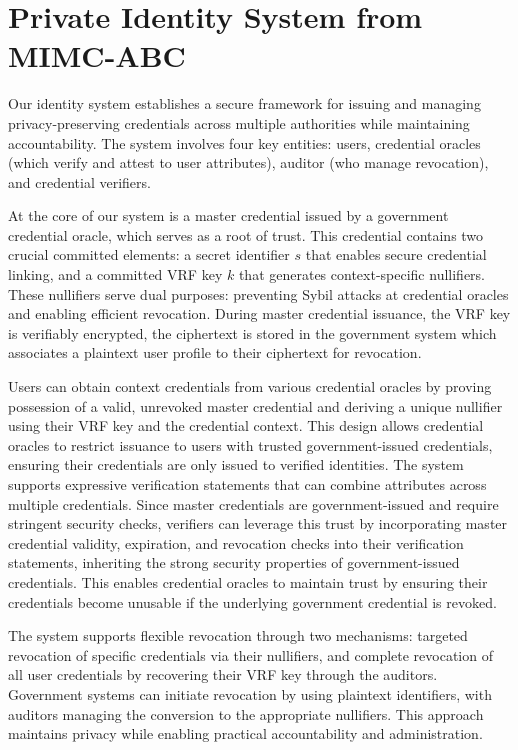 \cleardoublepage
\section{Private Identity System from MIMC-ABC}\label{sec:idsys}

Our identity system establishes a secure framework for issuing and managing privacy-preserving credentials across multiple authorities while maintaining accountability. The system involves four key entities: users, credential oracles (which verify and attest to user attributes), auditor (who manage revocation), and credential verifiers.

\noindent At the core of our system is a master credential issued by a government credential oracle, which serves as a root of trust. This credential contains two crucial committed elements: a secret identifier $s$ that enables secure credential linking, and a committed VRF key $k$ that generates context-specific nullifiers. These nullifiers serve dual purposes: preventing Sybil attacks at credential oracles and enabling efficient revocation. During master credential issuance, the VRF key is verifiably encrypted, the ciphertext is stored in the government system which associates a plaintext user profile to their ciphertext for revocation.


\noindent Users can obtain context credentials from various credential oracles by proving possession of a valid, unrevoked master credential and deriving a unique nullifier using their VRF key and the credential context. This design allows credential oracles to restrict issuance to users with trusted government-issued credentials, ensuring their credentials are only issued to verified identities. The system supports expressive verification statements that can combine attributes across multiple credentials. Since master credentials are government-issued and require stringent security checks, verifiers can leverage this trust by incorporating master credential validity, expiration, and revocation checks into their verification statements, inheriting the strong security properties of government-issued credentials. This enables credential oracles to maintain trust by ensuring their credentials become unusable if the underlying government credential is revoked.


\noindent The system supports flexible revocation through two mechanisms: targeted revocation of specific credentials via their nullifiers, and complete revocation of all user credentials by recovering their VRF key through the auditors. Government systems can initiate revocation by using plaintext identifiers, with auditors managing the conversion to the appropriate nullifiers. This approach maintains privacy while enabling practical accountability and administration.

